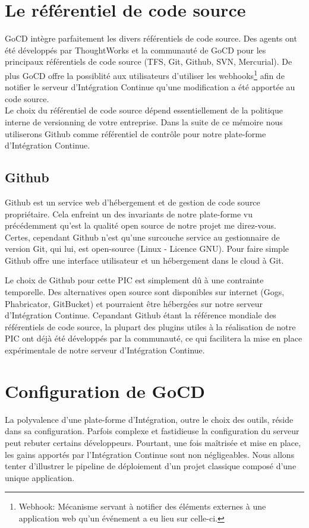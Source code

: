     \section{Le référentiel de code source}\label{Repository}
    GoCD intègre parfaitement les divers référentiels de code source. Des agents ont été développés par ThoughtWorks et la communauté de GoCD pour les principaux référentiels de code source (TFS, Git, Github, SVN, Mercurial). De plus GoCD offre la possiblité aux utilisateurs d'utiliser les \gls{webhook}s\footnote{Webhook: Mécanisme servant à notifier des éléments externes à une application web qu'un événement a eu lieu sur celle-ci.} afin de notifier le serveur d'Intégration Continue qu'une modification a été apportée au code source.\\

    Le choix du référentiel de code source dépend essentiellement de la politique interne de versionning de votre entreprise. Dans la suite de ce mémoire nous utiliserons Github comme référentiel de contrôle pour notre plate-forme d'Intégration Continue.

      \subsection{Github}
      Github est un service web d'hébergement et de gestion de code source propriétaire. Cela enfreint un des invariants de notre plate-forme vu précédemment qu'est la qualité open source de notre projet me direz-vous. Certes, cependant Github n'est qu'une surcouche service au gestionnaire de version Git, qui lui, est open-source (Linux - Licence GNU). Pour faire simple Github offre une interface utilisateur et un hébergement dans le cloud à Git.

      Le choix de Github pour cette PIC est simplement dû à une contrainte temporelle. Des alternatives open source sont disponibles sur internet (Gogs, Phabricator, GitBucket) et pourraient être hébergées sur notre serveur d'Intégration Continue. Cepandant Github étant la référence mondiale des référentiels de code source, la plupart des plugins utiles à la réalisation de notre PIC ont déjà été développés par la communauté, ce qui facilitera la mise en place expérimentale de notre serveur d'Intégration Continue.

    \section{Configuration de GoCD}
    La polyvalence d'une plate-forme d'Intégration, outre le choix des outils, réside dans sa configuration. Parfois complexe et fastidieuse la configuration du serveur peut rebuter certains développeurs. Pourtant, une fois maîtrisée et mise en place, les gains apportés par l'Intégration Continue sont non négligeables. Nous allons tenter d'illustrer le pipeline de déploiement d'un projet classique composé d'une unique application.

